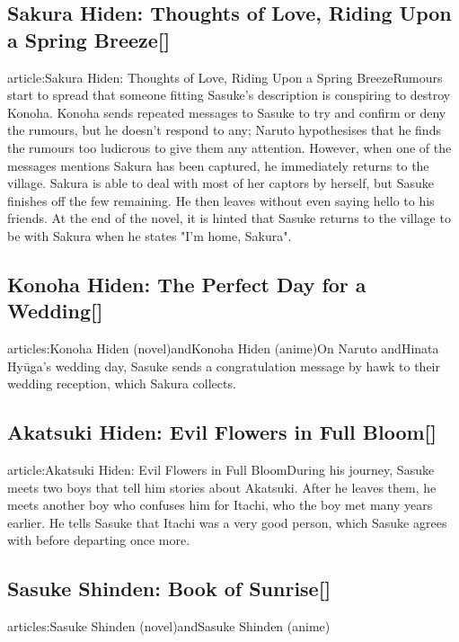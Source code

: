 \documentclass[a4paper,12pt]{article}
\begin{document}
\subsection*{Sakura Hiden: Thoughts of Love, Riding Upon a Spring Breeze[]}\n\nMain article:Sakura Hiden: Thoughts of Love, Riding Upon a Spring BreezeRumours start to spread that someone fitting Sasuke's description is conspiring to destroy Konoha. Konoha sends repeated messages to Sasuke to try and confirm or deny the rumours, but he doesn't respond to any; Naruto hypothesises that he finds the rumours too ludicrous to give them any attention. However, when one of the messages mentions Sakura has been captured, he immediately returns to the village. Sakura is able to deal with most of her captors by herself, but Sasuke finishes off the few remaining. He then leaves without even saying hello to his friends. At the end of the novel, it is hinted that Sasuke returns to the village to be with Sakura when he states "I'm home, Sakura".\\ \par \vspace{0.5cm}

\subsection*{Konoha Hiden: The Perfect Day for a Wedding[]}\n\nMain articles:Konoha Hiden (novel)andKonoha Hiden (anime)On Naruto andHinata Hyūga's wedding day, Sasuke sends a congratulation message by hawk to their wedding reception, which Sakura collects.\\ \par \vspace{0.5cm}

\subsection*{Akatsuki Hiden: Evil Flowers in Full Bloom[]}\n\nMain article:Akatsuki Hiden: Evil Flowers in Full BloomDuring his journey, Sasuke meets two boys that tell him stories about Akatsuki. After he leaves them, he meets another boy who confuses him for Itachi, who the boy met many years earlier. He tells Sasuke that Itachi was a very good person, which Sasuke agrees with before departing once more.\\ \par \vspace{0.5cm}

\subsection*{Sasuke Shinden: Book of Sunrise[]}\n\nMain articles:Sasuke Shinden (novel)andSasuke Shinden (anime)\\ \par \vspace{0.5cm}
\end{document}

